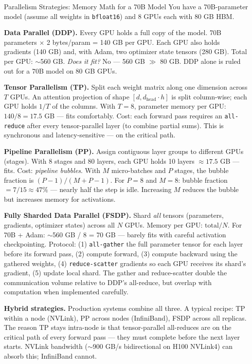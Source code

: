 \begin{thinkfirst}{Parallelism Strategies: Memory Math for a 70B Model}
You have a 70B-parameter model (assume all weights in \texttt{bfloat16}) and 8 GPUs each with 80 GB HBM.

\medskip
\textbf{Data Parallel (DDP).}
Every GPU holds a full copy of the model.
70B parameters $\times$ 2 bytes/param = 140 GB per GPU.
Each GPU also holds gradients (140 GB) and, with Adam, two optimizer state tensors (280 GB).
Total per GPU: $\sim$560 GB.
\emph{Does it fit?} No --- 560 GB $\gg$ 80 GB.
DDP alone is ruled out for a 70B model on 80 GB GPUs.

\medskip
\textbf{Tensor Parallelism (TP).}
Split each weight matrix along one dimension across $T$ GPUs.
An attention projection of shape $[d, d_{\text{head}} \cdot h]$ is split column-wise; each GPU holds
$1/T$ of the columns.
With $T = 8$, parameter memory per GPU: $140/8 = 17.5$ GB --- fits comfortably.
Cost: each forward pass requires an \texttt{all-reduce} after every tensor-parallel layer
(to combine partial sums).
This is synchronous and latency-sensitive --- on the critical path.

\medskip
\textbf{Pipeline Parallelism (PP).}
Assign contiguous layer groups to different GPUs (stages).
With 8 stages and 80 layers, each GPU holds 10 layers $\approx 17.5$ GB --- fits.
Cost: \emph{pipeline bubbles}.
With $M$ micro-batches and $P$ stages, the bubble fraction is $(P-1)/(M+P-1)$.
For $P=8$ and $M=8$: bubble fraction $= 7/15 \approx 47\%$ --- nearly half the step is idle.
Increasing $M$ reduces the bubble but increases memory for activations.

\medskip
\textbf{Fully Sharded Data Parallel (FSDP).}
Shard \emph{all} tensors (parameters, gradients, optimizer states) across all $N$ GPUs.
Memory per GPU: $\text{total} / N$.
For 70B + Adam: $\sim$560 GB / 8 = 70 GB --- barely fits with careful activation checkpointing.
Protocol: (1) \texttt{all-gather} the full parameter tensor for each layer before its forward pass,
(2) compute forward, (3) compute backward using the gathered weights,
(4) \texttt{reduce-scatter} gradients so each GPU receives its shard's gradient,
(5) update local shard.
The gather and reduce-scatter double the communication volume relative to DDP's all-reduce, but
overlap with computation when implemented carefully.

\medskip
\textbf{Hybrid strategies.}
Production systems combine all three.
A typical recipe: TP within a node (NVLink), PP across nodes (InfiniBand), FSDP across all replicas.
The reason TP stays intra-node is that tensor-parallel all-reduces are on the critical path of every
forward pass --- they must complete before the next layer starts.
NVLink bandwidth ($\sim$900 GB/s bidirectional on H100 NVLink4) can absorb this; InfiniBand cannot.


\end{thinkfirst}
